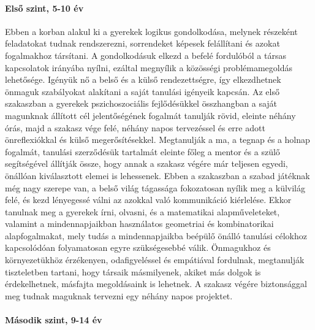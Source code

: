 \paragraph{Első szint, 5-10 év }

Ebben a korban alakul ki a gyerekek logikus gondolkodása, melynek részeként
feladatokat tudnak rendszerezni, sorrendeket képesek felállítani és azokat
fogalmakhoz társítani. A gondolkodásuk elkezd a befelé fordulóból a társas
kapcsolatok irányába nyílni, ezáltal megnyílik a közösségi problémamegoldás
lehetősége. Igényük nő a belső és a külső rendezettségre, így elkezdhetnek
önmaguk szabályokat alakítani a saját tanulási igényeik kapcsán.
Az első szakaszban a gyerekek pszichoszociális fejlődésükkel összhangban a
saját magunknak állított cél jelentőségének fogalmát tanulják rövid, eleinte
néhány órás, majd a szakasz vége felé, néhány napos tervezéssel és erre adott
önreflexiókkal és külső megerősítésekkel. Megtanulják a ma, a tegnap és a
holnap fogalmát, tanulási szerződésük tartalmát eleinte főleg a mentor és a
szülő segítségével állítják össze, hogy annak a szakasz végére már teljesen
egyedi, önállóan kiválasztott elemei is lehessenek.
Ebben a szakaszban a szabad játéknak még nagy szerepe van, a belső világ
tágassága fokozatosan nyílik meg a külvilág felé, és kezd lényegessé válni az
azokkal való kommunikáció kiérlelése.
Ekkor tanulnak meg a gyerekek írni, olvasni, és a matematikai alapműveleteket,
valamint a mindennapjaikban használatos  geometriai és kombinatorikai
alapfogalmakat, mely tudás a mindennapjaikba beépülő önálló tanulási célokhoz
kapcsolódóan folyamatosan egyre szükségesebbé válik. Önmagukhoz és
környezetükhöz érzékenyen, odafigyeléssel és empátiával fordulnak, megtanulják
tiszteletben tartani, hogy társaik másmilyenek, akiket más dolgok is
érdekelhetnek, másfajta megoldásaink is lehetnek.
A szakasz végére biztonsággal meg tudnak maguknak tervezni egy néhány napos
projektet.

\paragraph{Második szint, 9-14 év}

